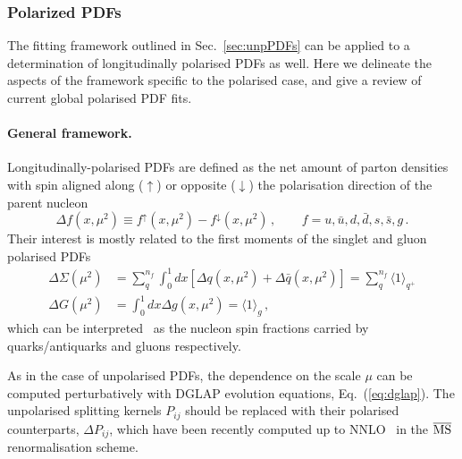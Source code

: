 \subsubsection{Polarized PDFs}
\label{sec:polPDFs}

The fitting framework outlined in Sec.~\ref{sec:unpPDFs} can be applied
to a determination of longitudinally polarised PDFs as well.
%
Here we delineate the aspects of the framework specific to the polarised
case, and give a review of current global polarised PDF fits.

\paragraph{General framework.}
%
Longitudinally-polarised PDFs are defined as the net amount of parton 
densities with spin aligned along ($\uparrow$) or opposite ($\downarrow$)
the polarisation direction of the parent nucleon
\begin{equation}
\Delta f(x,\mu^2) \equiv f^{\uparrow}(x,\mu^2) - f^{\downarrow}(x,\mu^2)
\,\mbox{,}
\ \ \ \ \ \ \ \ \ \
f=u,\bar{u},d,\bar{d},s,\bar{s},g
\,\mbox{.}
\label{eq:polPDFs}
\end{equation}
%
Their interest is mostly related to the
first moments of the singlet and gluon polarised PDFs
\begin{align}
\Delta\Sigma(\mu^2)
& =
\sum_{q}^{n_f}\int_0^1 dx 
\left[\Delta q(x, \mu^2) + \Delta\bar{q}(x, \mu^2)\right]
=
\sum_q^{n_f}\langle 1 \rangle_{q^+}
\\
\Delta G(\mu^2)
& =
\int_0^1 dx \Delta g(x,\mu^2)
=
\langle 1 \rangle_g
\,,
\label{eq:moments}
\end{align}
which can be interpreted~\cite{Leader:2013jra} as the nucleon spin fractions 
carried by quarks/antiquarks and gluons respectively.

As in the case of unpolarised PDFs, the dependence on the scale $\mu$ can 
be computed perturbatively with DGLAP evolution equations, 
Eq.~(\ref{eq:dglap}).
%
The unpolarised splitting kernels $P_{ij}$ should be replaced with their
polarised counterparts, $\Delta P_{ij}$, which have been recently computed 
up to NNLO~\cite{Moch:2014sna} in the $\overline{\rm MS}$ renormalisation 
scheme.

